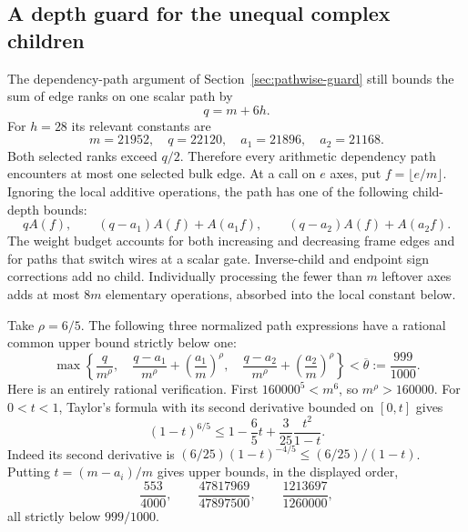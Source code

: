 \subsection{A depth guard for the unequal complex children}
\label{sec:bulk-complex-guard}

The dependency-path argument of Section~\ref{sec:pathwise-guard}
still bounds the sum of edge ranks on one scalar path by
\[
 q=m+6h.
\]
For $h=28$ its relevant constants are
\[
 m=21952,\quad q=22120,\quad a_1=21896,\quad a_2=21168.
\]
Both selected ranks exceed $q/2$. Therefore every arithmetic dependency
path encounters at most one selected bulk edge. At a call on $e$ axes,
put $f=\lfloor e/m\rfloor$. Ignoring the local additive operations,
the path has one of the following child-depth bounds:
\[
 qA(f),\qquad
 (q-a_1)A(f)+A(a_1f),\qquad
 (q-a_2)A(f)+A(a_2f).
\]
The weight budget accounts for both increasing and decreasing frame
edges and for paths that switch wires at a scalar gate. Inverse-child
and endpoint sign corrections add no child. Individually processing
the fewer than $m$ leftover axes adds at most $8m$ elementary
operations, absorbed into the local constant below.

Take $\rho=6/5$. The following three normalized path expressions have
a rational common upper bound strictly below one:
\begin{equation}\label{eq:bulk-path-moments}
 \max\left\{\frac q{m^\rho},\quad
 \frac{q-a_1}{m^\rho}+\left(\frac{a_1}m\right)^\rho,\quad
 \frac{q-a_2}{m^\rho}+\left(\frac{a_2}m\right)^\rho\right\}
 <\overline\theta:=\frac{999}{1000}.
\end{equation}
Here is an entirely rational verification. First
$160000^5<m^6$, so $m^\rho>160000$. For $0<t<1$, Taylor's formula
with its second derivative bounded on $[0,t]$ gives
\[
 (1-t)^{6/5}
 \le1-\frac65t+\frac3{25}\frac{t^2}{1-t}.
\]
Indeed its second derivative is
$(6/25)(1-t)^{-4/5}\le(6/25)/(1-t)$.
Putting $t=(m-a_i)/m$ gives upper bounds, in the displayed order,
\[
 \frac{553}{4000},\qquad
 \frac{47817969}{47897500},\qquad
 \frac{1213697}{1260000},
\]
all strictly below $999/1000$.

